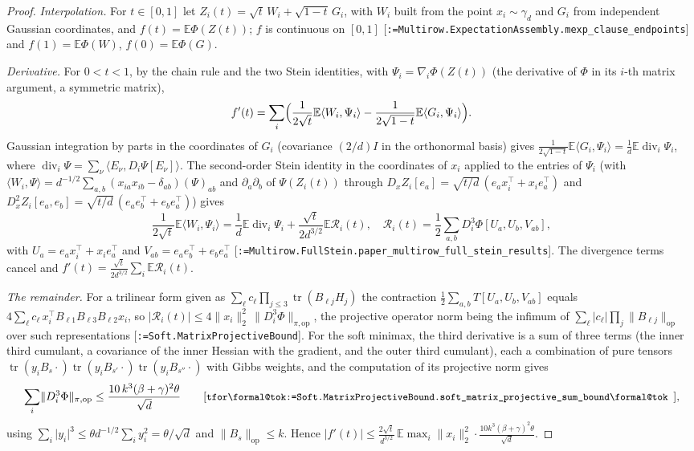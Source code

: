 \documentclass[11pt]{article}
\makeatletter
\newcommand{\formal@break}[1]{\@tfor\formal@tok:=#1\do{%
  \formal@tok
  \expandafter\ifx\formal@tok.\allowbreak\else
  \expandafter\ifx\formal@tok\_\allowbreak\fi\fi}}
\DeclareRobustCommand{\formal}[1]{\textnormal{[\texttt{\small\formal@break{#1}}]}}
\newcommand{\E}{\mathbb{E}}
\newcommand{\ip}[2]{\langle #1, #2\rangle}
\newcommand{\norm}[1]{\lVert #1\rVert}
\newcommand{\abs}[1]{\lvert #1\rvert}
\newcommand{\tr}{\operatorname{tr}}
\newcommand{\op}{\mathrm{op}}
\newcommand{\sqd}{\sqrt{d}}
\newcommand{\Id}{I}
\newcommand{\gauss}{\gamma}
\theoremstyle{plain}
\theoremstyle{definition}
\makeatother
\begin{document}
\begin{proof}
\emph{Interpolation.} For $t \in [0,1]$ let $Z_i(t) = \sqrt t\,W_i + \sqrt{1-t}\,G_i$,
with $W_i$ built from the point $x_i \sim \gauss_d$ and $G_i$ from
independent Gaussian coordinates, and $f(t) = \E\Phi(Z(t))$; $f$ is
continuous on $[0,1]$ \formal{Multirow.ExpectationAssembly.mexp\_clause\_endpoints}
and $f(1) = \E\Phi(W)$, $f(0) = \E\Phi(G)$.

\emph{Derivative.} For $0 < t < 1$, by the chain rule and the two Stein
identities, with $\Psi_i = \nabla_i\Phi(Z(t))$ (the derivative of $\Phi$ in
its $i$-th matrix argument, a symmetric matrix),
\[
f'(t) = \sum_i\Bigl(\frac{1}{2\sqrt t}\E\ip{W_i}{\Psi_i} - \frac{1}{2\sqrt{1-t}}\E\ip{G_i}{\Psi_i}\Bigr).
\]
Gaussian integration by parts in the coordinates of $G_i$ (covariance
$(2/d)\Id$ in the orthonormal basis) gives $\frac{1}{2\sqrt{1-t}}\E\ip{G_i}{\Psi_i} = \frac1d\E\operatorname{div}_i\Psi_i$,
where $\operatorname{div}_i\Psi = \sum_\nu\ip{E_\nu}{D_i\Psi[E_\nu]}$. The
second-order Stein identity in the coordinates of $x_i$ applied to the
entries of $\Psi_i$ (with $\ip{W_i}{\Psi} = d^{-1/2}\sum_{a,b}(x_{ia}x_{ib} - \delta_{ab})(\Psi)_{ab}$
and $\partial_a\partial_b$ of $\Psi(Z_i(t))$ through
$D_xZ_i[e_a] = \sqrt{t/d}\,(e_ax_i^{\top} + x_ie_a^{\top})$ and
$D_x^2Z_i[e_a,e_b] = \sqrt{t/d}\,(e_ae_b^{\top} + e_be_a^{\top})$) gives
\[
\frac{1}{2\sqrt t}\E\ip{W_i}{\Psi_i} = \frac1d\E\operatorname{div}_i\Psi_i + \frac{\sqrt t}{2d^{3/2}}\E\mathcal{R}_i(t),
\quad
\mathcal{R}_i(t) = \frac12\sum_{a,b}D_i^3\Phi[U_a, U_b, V_{ab}],
\]
with $U_a = e_ax_i^{\top} + x_ie_a^{\top}$ and $V_{ab} = e_ae_b^{\top} + e_be_a^{\top}$
\formal{Multirow.FullStein.paper\_multirow\_full\_stein\_results}. The
divergence terms cancel and
$f'(t) = \frac{\sqrt t}{2d^{3/2}}\sum_i\E\mathcal{R}_i(t)$.

\emph{The remainder.} For a trilinear form given as $\sum_\ell c_\ell\prod_{j\le3}\tr(B_{\ell j}H_j)$
the contraction $\frac12\sum_{a,b}T[U_a,U_b,V_{ab}]$ equals
$4\sum_\ell c_\ell\,x_i^{\top}B_{\ell1}B_{\ell3}B_{\ell2}x_i$, so
$\abs{\mathcal{R}_i(t)} \le 4\norm{x_i}_2^2\,\norm{D_i^3\Phi}_{\pi,\op}$, the
projective operator norm being the infimum of $\sum_\ell\abs{c_\ell}\prod_j\norm{B_{\ell j}}_\op$
over such representations \formal{Soft.MatrixProjectiveBound}. For the soft
minimax, the third derivative is a sum of three terms (the inner third
cumulant, a covariance of the inner Hessian with the gradient, and the
outer third cumulant), each a combination of pure tensors
$\tr(y_iB_s\cdot)\tr(y_iB_{s'}\cdot)\tr(y_iB_{s''}\cdot)$ with Gibbs
weights, and the computation of its projective norm gives
\[
\sum_i\norm{D_i^3\Phi}_{\pi,\op} \le \frac{10\,k^3(\beta + \gamma)^2\theta}{\sqd}
\tag*{\formal{Soft.MatrixProjectiveBound.soft\_matrix\_projective\_sum\_bound},}
\]
using $\sum_i\abs{y_i}^3 \le \theta d^{-1/2}\sum_iy_i^2 = \theta/\sqd$ and
$\norm{B_s}_\op \le k$. Hence
$\abs{f'(t)} \le \frac{2\sqrt t}{d^{3/2}}\,\E\max_i\norm{x_i}_2^2\cdot\frac{10k^3(\beta+\gamma)^2\theta}{\sqd}$.


\end{proof}
\end{document}
